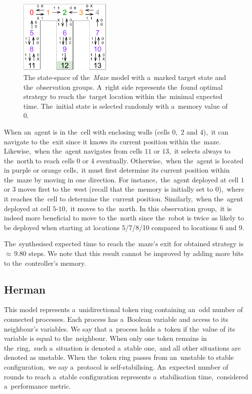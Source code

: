 \begin{figure}[h!]
\centering
\includegraphics[width=0.4\textwidth]{figures/maze.pdf}
\caption{The state-space of the~\textit{Maze} model with a~marked target state and the~observation groups. A~right side represents the~found optimal strategy to reach the~target location within the~minimal expected time. The~initial state is selected randomly with a~memory value of 0.}%
\label{fig:maze}%
\end{figure}

When an~agent is in the~cell with enclosing walls (cells 0,~2 and 4),~it can navigate to the~exit since it knows its current position within the~maze.
Likewise,~when the~agent navigates from cells $11$ or $13$,~it selects always to the~north to reach cells $0$ or $4$ eventually.
Otherwise,~when the~agent is located in purple or orange cells,~it must first determine its current position within the~maze by moving in one direction.
For instance,~the~agent deployed at cell $1$ or $3$ moves first to the~west (recall that the~memory is initially set to 0),~where it reaches the~cell to determine the~current position.
Similarly,~when the~agent deployed at cell $5$-$10$,~it moves to the~north.
In this observation group,~it is indeed more beneficial to move to the~north since the~robot is twice as likely to be deployed when starting at locations 5/7/8/10 compared to locations 6 and 9.

The~synthesised expected time to reach the~maze's exit for obtained strategy is ${\approx} \, 9.80$ steps. 
We note that this result cannot be improved by adding more bits to the~controller's memory.

\subsection{Herman}
This model represents a~unidirectional token ring containing an~odd number of connected processes.
Each process has a~Boolean variable and access to its neighbour's variables.
We say that a~process holds a~token if the~value of its variable is equal to the~neighbour.
When only one token remains in the~ring,~such a~situation is denoted a~stable one,~and all other situations are denoted as unstable.
When the~token ring passes from an~unstable to stable configuration,~we say a~protocol is self-stabilising.
An~expected number of rounds to reach a~stable configuration represents a~stabilisation time,~considered a~performance metric.

